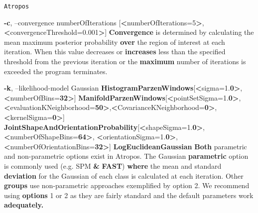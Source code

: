 \documentclass[ignorenonframetext,]{beamer}
\newenvironment{Shaded}{\begin{snugshade}}{\end{snugshade}}
\newcommand{\KeywordTok}[1]{\textcolor[rgb]{0.13,0.29,0.53}{\textbf{{#1}}}}
\newcommand{\OtherTok}[1]{\textcolor[rgb]{0.56,0.35,0.01}{{#1}}}
\newcommand{\NormalTok}[1]{{#1}}
\begin{document}
\begin{frame}[fragile]{\texttt{Atropos}}
\begin{Shaded}
\begin{Highlighting}[]
     \KeywordTok{-c}\NormalTok{, --convergence numberOfIterations}
                       \NormalTok{[}\KeywordTok{<}\OtherTok{numberOfIterations=}\NormalTok{5}\KeywordTok{>}\NormalTok{,}\KeywordTok{<}\OtherTok{convergenceThreshold=}\NormalTok{0.001}\KeywordTok{>}\NormalTok{]}
          \KeywordTok{Convergence} \NormalTok{is determined by calculating the mean maximum posterior probability}
          \KeywordTok{over} \NormalTok{the region of interest at each iteration. When this value decreases or}
          \KeywordTok{increases} \NormalTok{less than the specified threshold from the previous iteration or the}
          \KeywordTok{maximum} \NormalTok{number of iterations is exceeded the program terminates.}

     \KeywordTok{-k}\NormalTok{, --likelihood-model Gaussian}
                            \KeywordTok{HistogramParzenWindows}\NormalTok{[}\KeywordTok{<}\NormalTok{sigma=1.}\KeywordTok{0>}\NormalTok{,}\KeywordTok{<}\NormalTok{numberOfBins=}\KeywordTok{32>}\NormalTok{]}
                            \KeywordTok{ManifoldParzenWindows}\NormalTok{[}\KeywordTok{<}\NormalTok{pointSetSigma=1.}\KeywordTok{0>}\NormalTok{,}\KeywordTok{<}\NormalTok{evaluationKNeighborhood=}\KeywordTok{50>}\NormalTok{,}\KeywordTok{<}\NormalTok{CovarianceKNeighborhood=}\KeywordTok{0>}\NormalTok{,}\KeywordTok{<}\NormalTok{kernelSigma=}\KeywordTok{0>}\NormalTok{]}
                            \KeywordTok{JointShapeAndOrientationProbability}\NormalTok{[}\KeywordTok{<}\NormalTok{shapeSigma=1.}\KeywordTok{0>}\NormalTok{,}\KeywordTok{<}\NormalTok{numberOfShapeBins=}\KeywordTok{64>}\NormalTok{, }\KeywordTok{<}\NormalTok{orientationSigma=1.}\KeywordTok{0>}\NormalTok{, }\KeywordTok{<}\NormalTok{numberOfOrientationBins=}\KeywordTok{32>}\NormalTok{]}
                            \KeywordTok{LogEuclideanGaussian}
          \KeywordTok{Both} \NormalTok{parametric and non-parametric options exist in Atropos. The Gaussian}
          \KeywordTok{parametric} \NormalTok{option is commonly used (e.g. SPM }\KeywordTok{&} \KeywordTok{FAST}\NormalTok{) }\KeywordTok{where} \NormalTok{the mean and standard}
          \KeywordTok{deviation} \NormalTok{for the Gaussian of each class is calculated at each iteration. Other}
          \KeywordTok{groups} \NormalTok{use non-parametric approaches exemplified by option 2. We recommend using}
          \KeywordTok{options} \NormalTok{1 or 2 as they are fairly standard and the default parameters work}
          \KeywordTok{adequately.}


\end{Highlighting}
\end{Shaded}
\end{frame}
\end{document}

